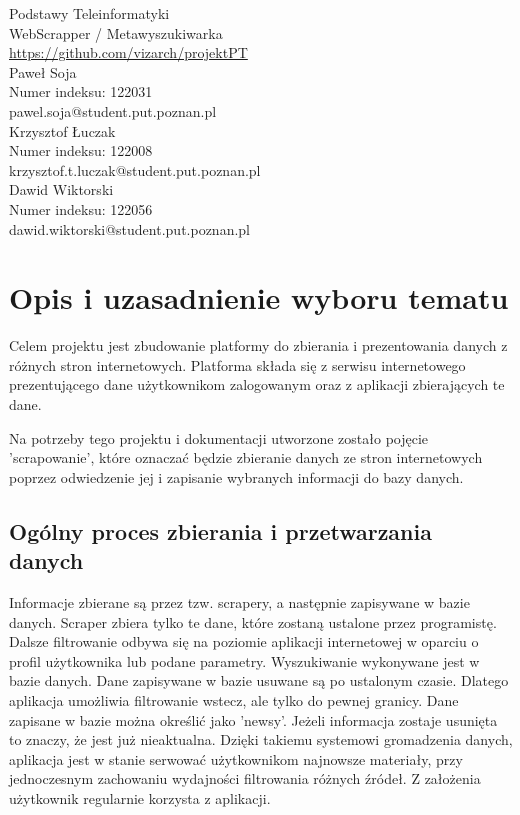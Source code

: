 \documentclass[12pt, titlepage]{article}
\begin{document}
	\begin{titlepage}
		\thispagestyle{firstpage}
		\centering
			\vspace*{5cm}
			{\huge Podstawy Teleinformatyki\\
				WebScrapper / Metawyszukiwarka\\}
			\vspace{6cm}
			{\large \url{https://github.com/vizarch/projektPT}\\}
			\vspace{1cm}
			{\large
			Paweł Soja\\
			Numer indeksu: 122031\\
			pawel.soja@student.put.poznan.pl\\
			\vspace{0.5cm}
			Krzysztof Łuczak\\
			Numer indeksu: 122008\\
			krzysztof.t.luczak@student.put.poznan.pl\\
			\vspace{0.5cm}
			Dawid Wiktorski\\
			Numer indeksu: 122056\\
			dawid.wiktorski@student.put.poznan.pl\\}
	\end{titlepage}
	\tableofcontents
	\listoftables
	
	\newpage
	\section{Opis i uzasadnienie wyboru tematu}
	Celem projektu jest zbudowanie platformy do zbierania i prezentowania danych z różnych stron internetowych. Platforma składa się z serwisu internetowego prezentującego dane użytkownikom zalogowanym oraz z aplikacji zbierających te dane.
	
	Na potrzeby tego projektu i dokumentacji utworzone zostało pojęcie 'scrapowanie', które oznaczać będzie zbieranie danych ze stron internetowych poprzez odwiedzenie jej i zapisanie wybranych informacji do bazy danych.
	
	\subsection{Ogólny proces zbierania i przetwarzania danych}
	Informacje zbierane są przez tzw. scrapery, a następnie zapisywane w bazie danych. Scraper zbiera tylko te dane, które zostaną ustalone przez programistę. Dalsze filtrowanie odbywa się na poziomie aplikacji internetowej w oparciu o profil użytkownika lub podane parametry. Wyszukiwanie wykonywane jest w bazie danych. Dane zapisywane w bazie usuwane są po ustalonym czasie. Dlatego aplikacja umożliwia filtrowanie wstecz, ale tylko do pewnej granicy. Dane zapisane w bazie można określić jako 'newsy'. Jeżeli informacja zostaje usunięta to znaczy, że jest już nieaktualna. Dzięki takiemu systemowi gromadzenia danych, aplikacja jest w stanie serwować użytkownikom najnowsze materiały, przy jednoczesnym zachowaniu wydajności filtrowania różnych źródeł. Z założenia użytkownik regularnie korzysta z aplikacji.
	
\end{document}
